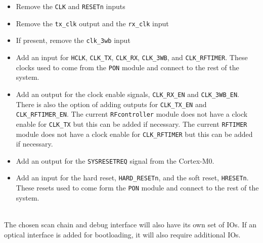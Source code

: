 \begin{itemize}
	\item Remove the \texttt{CLK} and \texttt{RESETn} inputs
	\item Remove the \texttt{tx\_clk} output and the \texttt{rx\_clk} input
	\item If present, remove the \texttt{clk\_3wb} input
	\item Add an input for \texttt{HCLK}, \texttt{CLK\_TX}, \texttt{CLK\_RX}, \texttt{CLK\_3WB}, and \texttt{CLK\_RFTIMER}. These clocks used to come from the \texttt{PON} module and connect to the rest of the system.
	\item Add an output for the clock enable signals, \texttt{CLK\_RX\_EN} and \texttt{CLK\_3WB\_EN}. There is also the option of adding outputs for \texttt{CLK\_TX\_EN} and \texttt{CLK\_RFTIMER\_EN}. The current \texttt{RFcontroller} module does not have a clock enable for \texttt{CLK\_TX} but this can be added if necessary. The current \texttt{RFTIMER} module does not have a clock enable for \texttt{CLK\_RFTIMER} but this can be added if necessary.
	\item Add an output for the \texttt{SYSRESETREQ} signal from the Cortex-M0.
	\item Add an input for the hard reset, \texttt{HARD\_RESETn}, and the soft reset, \texttt{HRESETn}. These resets used to come form the \texttt{PON} module and connect to the rest of the system.
\end{itemize}
\ \\
The chosen scan chain and debug interface will also have its own set of IOs. If an optical interface is added for bootloading, it will also require additional IOs.